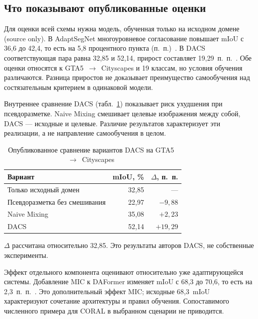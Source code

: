 \subsection{Что показывают опубликованные оценки}
Для оценки всей схемы нужна модель, обученная только на исходном домене (source only). В AdaptSegNet многоуровневое согласование повышает mIoU с 36,6 до 42,4, то есть на 5,8 процентного пункта (п.~п.)~\cite[табл.~1]{tsai}. В DACS соответствующая пара равна 32,85 и 52,14, прирост составляет 19,29~п.~п.~\cite[табл.~1]{dacs}. Обе оценки относятся к GTA5~$\rightarrow$~Cityscapes и 19 классам, но условия обучения различаются. Разница приростов не доказывает преимущество самообучения над состязательным критерием в одинаковой модели.

Внутреннее сравнение DACS (табл.~\ref{tab:dacs}) показывает риск ухудшения при псевдоразметке. Naive Mixing смешивает целевые изображения между собой, DACS --- исходные и целевые. Различие результатов характеризует эти реализации, а не направление самообучения в целом.

\begin{table}[htbp]
\caption{Опубликованное сравнение вариантов DACS на GTA5~$\rightarrow$~Cityscapes~\cite[табл.~3]{dacs}}
\label{tab:dacs}
\centering
\setlength{\tabcolsep}{3pt}
\begin{tabularx}{\columnwidth}{@{}Xrr@{}}
\toprule
Вариант & mIoU, \% & $\Delta$, п.~п.\\
\midrule
Только исходный домен & 32,85 & ---\\
Псевдоразметка без смешивания & 22,97 & $-9{,}88$\\
Naive Mixing & 35,08 & $+2{,}23$\\
DACS & 52,14 & $+19{,}29$\\
\bottomrule
\end{tabularx}
\par\vspace{3pt}
{\footnotesize $\Delta$ рассчитана относительно 32,85. Это результаты авторов DACS, не собственные эксперименты.}
\end{table}

Эффект отдельного компонента оценивают относительно уже адаптирующейся системы. Добавление MIC к DAFormer изменяет mIoU с 68,3 до 70,6, то есть на 2,3~п.~п.~\cite[табл.~7]{mic}. Это дополнительный эффект MIC; исходные 68,3~mIoU~\cite{daformer} характеризуют сочетание архитектуры и правил обучения. Сопоставимого численного примера для CORAL в выбранном сценарии не приводится.
